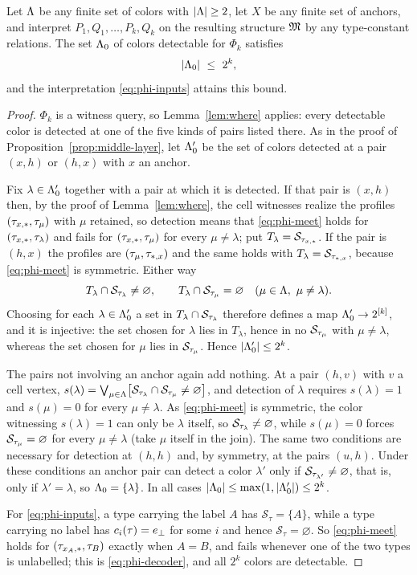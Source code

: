 \begin{proposition}\label{prop:all-labels}
Let $\Lambda$ be any finite set of colors with $|\Lambda|\ge2$, let $X$ be any
finite set of anchors, and interpret $P_1,Q_1,\ldots,P_k,Q_k$ on the
resulting structure $\mathfrak M$ by any type-constant relations. The set $\Lambda_0$ of
colors detectable for $\Phi_k$ satisfies
\[
 |\Lambda_0|\ \le\ 2^k,
\]
and the interpretation \eqref{eq:phi-inputs} attains this bound.
\end{proposition}
\begin{proof}
$\Phi_k$ is a witness query, so Lemma~\ref{lem:where} applies: every
detectable color is detected at one of the five kinds of pairs listed there.
As in the proof of Proposition~\ref{prop:middle-layer}, let $\Lambda_0'$ be the
set of colors detected at a pair $(x,h)$ or $(h,x)$ with $x$ an anchor.

Fix $\lambda\in\Lambda_0'$ together with a pair at which it is detected. If that
pair is $(x,h)$ then, by the proof of Lemma~\ref{lem:where}, the cell
witnesses realize the profiles $(\tau_{x,\ast},\tau_{\mu})$ with $\mu$ retained, so
detection means that \eqref{eq:phi-meet} holds for $(\tau_{x,\ast},\tau_{\lambda})$
and fails for $(\tau_{x,\ast},\tau_{\mu})$ for every $\mu\ne\lambda$; put
$T_\lambda=\mathcal S_{\tau_{x,\ast}}$. If the pair is $(h,x)$ the profiles are
$(\tau_{\mu},\tau_{\ast,x})$ and the same holds with
$T_\lambda=\mathcal S_{\tau_{\ast,x}}$, because \eqref{eq:phi-meet} is symmetric.
Either way
\[
 T_\lambda\cap\mathcal S_{\tau_{\lambda}}\ne\varnothing,\qquad
 T_\lambda\cap\mathcal S_{\tau_{\mu}}=\varnothing
 \quad(\mu\in\Lambda,\ \mu\ne\lambda).
\]
Choosing for each $\lambda\in\Lambda_0'$ a set in
$T_\lambda\cap\mathcal S_{\tau_{\lambda}}$ therefore defines a map
$\Lambda_0'\to2^{[k]}$, and it is injective: the set chosen for $\lambda$ lies in
$T_\lambda$, hence in no $\mathcal S_{\tau_{\mu}}$ with $\mu\ne\lambda$,
whereas the set chosen for $\mu$ lies in $\mathcal S_{\tau_{\mu}}$. Hence
$|\Lambda_0'|\le2^k$.

The pairs not involving an anchor again add nothing. At a pair $(h,v)$ with
$v$ a cell vertex,
$s(\lambda)=\bigvee_{\mu\in\Lambda}\bigl[\mathcal S_{\tau_{\lambda}}\cap
\mathcal S_{\tau_{\mu}}\ne\varnothing\bigr]$, and detection of $\lambda$
requires $s(\lambda)=1$ and $s(\mu)=0$ for every $\mu\ne\lambda$. As
\eqref{eq:phi-meet} is symmetric, the color witnessing $s(\lambda)=1$ can
only be $\lambda$ itself, so $\mathcal S_{\tau_{\lambda}}\ne\varnothing$,
while $s(\mu)=0$ forces $\mathcal S_{\tau_{\mu}}=\varnothing$ for every
$\mu\ne\lambda$ (take $\mu$ itself in the join). The same two conditions
are necessary for detection at $(h,h)$ and, by symmetry, at the pairs
$(u,h)$. Under these conditions an anchor pair can detect a color
$\lambda'$ only if $\mathcal S_{\tau_{\lambda'}}\ne\varnothing$, that is,
only if $\lambda'=\lambda$, so $\Lambda_0=\{\lambda\}$. In all cases
$|\Lambda_0|\le\max(1,|\Lambda_0'|)\le2^k$.

For \eqref{eq:phi-inputs}, a type carrying the label $A$ has
$\mathcal S_\tau=\{A\}$, while a type carrying no label has
$c_i(\tau)=e_{\bot}$ for some $i$ and hence $\mathcal S_\tau=\varnothing$. So
\eqref{eq:phi-meet} holds for $(\tau_{x_A,\ast},\tau_{B})$ exactly when $A=B$, and
fails whenever one of the two types is unlabelled; this is
\eqref{eq:phi-decoder}, and all $2^k$ colors are detectable.
\end{proof}
